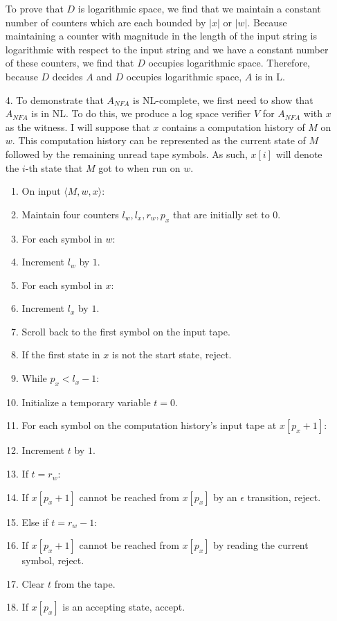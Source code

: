 \documentclass[11pt, reqno]{amsart}
\theoremstyle{plain}
\theoremstyle{definition}
\newcounter{r}
\def\tab{\hspace{10pt}}
\begin{document}
\begin{enumerate}
    To prove that $D$ is logarithmic space, we find that we maintain a constant
    number of counters which are each bounded by $|x|$ or $|w|$. Because
    maintaining a counter with magnitude in the length of the input string is
    logarithmic with respect to the input string and we have a constant number
    of these counters, we find that $D$ occupies logarithmic space. Therefore,
    because $D$ decides $A$ and $D$ occupies logarithmic space, $A$ is in L.
  \item[4.] To demonstrate that $A_{NFA}$ is NL-complete, we first need to show
    that $A_{NFA}$ is in NL. To do this, we produce a log space verifier $V$
    for $A_{NFA}$ with $x$ as the witness. I will suppose that $x$ contains a
    computation history of $M$ on $w$. This computation history can be
    represented as the current state of $M$ followed by the remaining unread
    tape symbols. As such, $x[i]$ will denote the $i$-th state that $M$ got to
    when run on $w$.
    \begin{enumerate}[1.]
      \item On input $\langle M, w, x\rangle$:
      \item\tab Maintain four counters $l_w, l_x, r_w, p_x$ that are
        initially set to $0$.
      \item\tab For each symbol in $w$:
      \item\tab\tab Increment $l_w$ by $1$.
      \item\tab For each symbol in $x$:
      \item\tab\tab Increment $l_x$ by $1$.
      \item\tab Scroll back to the first symbol on the input tape.
      \item\tab If the first state in $x$ is not the start state, reject.
      \item\tab While $p_x < l_x - 1$:
      \item\tab\tab Initialize a temporary variable $t = 0$.
      \item\tab\tab For each symbol on the computation history's
        input tape at $x[p_x+1]$:
      \item\tab\tab\tab Increment $t$ by $1$.
      \item\tab\tab If $t = r_w$:
      \item\tab\tab\tab If $x[p_x + 1]$ cannot be reached from $x[p_x]$ by an
        $\epsilon$ transition, reject.
      \item\tab\tab Else if $t = r_w - 1$:
      \item\tab\tab\tab If $x[p_x + 1]$ cannot be reached from $x[p_x]$ by
        reading the current symbol, reject.
      \item\tab\tab Clear $t$ from the tape.
      \item\tab If $x[p_x]$ is an accepting state, accept.

    \end{enumerate}
\end{enumerate}
\end{document}
